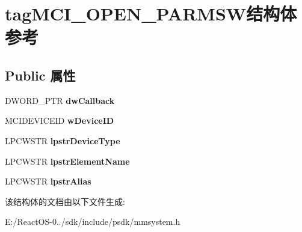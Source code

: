 \hypertarget{structtag_m_c_i___o_p_e_n___p_a_r_m_s_w}{}\section{tag\+M\+C\+I\+\_\+\+O\+P\+E\+N\+\_\+\+P\+A\+R\+M\+S\+W结构体 参考}
\label{structtag_m_c_i___o_p_e_n___p_a_r_m_s_w}
\subsection*{Public 属性}
\begin{DoxyCompactItemize}
\item 
\mbox{\label{structtag_m_c_i___o_p_e_n___p_a_r_m_s_w_a223e46782370f7b102194d8560d3efa2}} 
D\+W\+O\+R\+D\+\_\+\+P\+TR {\bfseries dw\+Callback}
\item 
\mbox{\label{structtag_m_c_i___o_p_e_n___p_a_r_m_s_w_ac851ddc7ad88af97c9ab2638bb7125dc}} 
M\+C\+I\+D\+E\+V\+I\+C\+E\+ID {\bfseries w\+Device\+ID}
\item 
\mbox{\label{structtag_m_c_i___o_p_e_n___p_a_r_m_s_w_a40402917320e2b1cb6af4309b5024a86}} 
L\+P\+C\+W\+S\+TR {\bfseries lpstr\+Device\+Type}
\item 
\mbox{\label{structtag_m_c_i___o_p_e_n___p_a_r_m_s_w_a8902e283c4dd55867ba7f39b9c324184}} 
L\+P\+C\+W\+S\+TR {\bfseries lpstr\+Element\+Name}
\item 
\mbox{\label{structtag_m_c_i___o_p_e_n___p_a_r_m_s_w_a9dc68b67681b0e28d1b4dd84f27a8ef8}} 
L\+P\+C\+W\+S\+TR {\bfseries lpstr\+Alias}
\end{DoxyCompactItemize}


该结构体的文档由以下文件生成\+:\begin{DoxyCompactItemize}
\item 
E\+:/\+React\+O\+S-\/0../sdk/include/psdk/mmsystem.\+h\end{DoxyCompactItemize}
